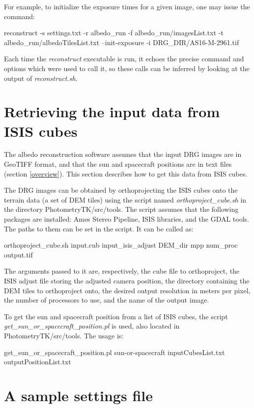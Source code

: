 \documentclass[letterpaper,fleqn,11pt]{report}
\renewcommand{\thesection}{\arabic{section}}
\begin{document}
For example, to initialize the exposure times for a given image, one may
issue the command:

reconstruct -s settings.txt -r albedo\_run -f albedo\_run/imagesList.txt -t albedo\_run/albedoTilesList.txt --init-exposure -i DRG\_DIR/AS16-M-2961.tif

Each time the {\it reconstruct} executable is run, it echoes the precise
command and options which were used to call it, so these calls can be
inferred by looking at the output of {\it reconstruct.sh}. 

\section{Retrieving the input data from ISIS cubes}

The albedo reconstruction software assumes that the input DRG images are in GeoTIFF
format, and that the sun and spacecraft positions are in text files (section \ref{overview}).
This section describes how to get this data from ISIS cubes.

The DRG images can be obtained by orthoprojecting the ISIS cubes 
onto the terrain data (a set of DEM tiles) using the script named {\it orthoproject\_cube.sh} in
the directory PhotometryTK/src/tools. The script assumes that the following packages
are installed: Ames Stereo Pipeline, ISIS libraries, and the GDAL
tools. The paths to them can be set in the script. It can be called
as:

orthoproject\_cube.sh input.cub input\_isis\_adjust DEM\_dir mpp num\_proc output.tif 

The arguments passed to it are, respectively, the cube file to
orthoproject, the ISIS adjust file storing the adjusted camera
position, the directory containing the DEM tiles to orthoproject onto, 
the desired output resolution in meters per pixel, the
number of processors to use, and the name of the output image.

To get the sun and spacecraft position from a list of ISIS cubes, the
script {\it get\_sun\_or\_spacecraft\_position.pl} is used, also located in PhotometryTK/src/tools.
The usage is: 

get\_sun\_or\_spacecraft\_position.pl sun-or-spacecraft inputCubesList.txt outputPositionList.txt


\appendix

\renewcommand{\thesection}{A-\arabic{section}}


\section{A sample settings file}
\end{document}
